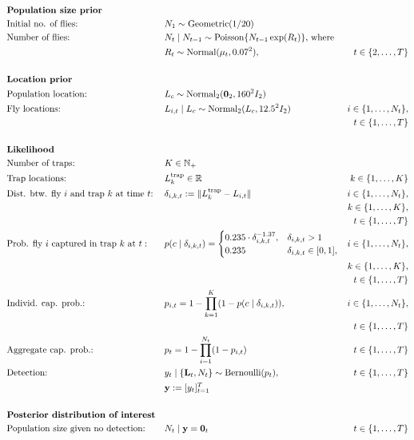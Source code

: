 \documentclass[
  oneside]{book}
\begin{document}
\[
\renewcommand{\baselinestretch}{1}\normalsize
\begin{aligned}
&\textbf{Population size prior} \\
&\text{Initial no. of flies:} && N_1  \sim \mathrm{Geometric}(1/20) \\
& \text{Number of flies:}~ && N_t \mid N_{t-1}  \sim \mathrm{Poisson}\{ N_{t-1} \exp(R_t) \} \text{, where} \\ & && R_t \sim \mathrm{Normal}(\mu_t, 0.07^2), & t \in \{2, \ldots, T \} \\
\\
&\textbf{Location prior} \\
& \text{Population location:} ~ && L_c \sim \mathrm{Normal_2}(\mathbf 0_2, 160^2 I_2) \\
& \text{Fly locations:}~ && L_{i,t} \mid L_c \sim \mathrm{Normal}_2(L_c, 12.5^2 I_2) & i \in \{1, \ldots, N_t\}, \\
  &&&& t \in \{1, \ldots, T\}\\
\\
&\textbf{Likelihood} \\
& \text{Number of traps:}~ && K \in \mathbb N_+ \\
& \text{Trap locations:}~ && L_k^\text{trap} \in \mathbb R & k \in \{1, \ldots, K\} \\
& \text{Dist. btw. fly } i \text{ and trap } k \text{ at time } t \text{:} && \delta_{i,k,t} := \lVert L_k^\text{trap} - L_{i,t} \rVert & i \in \{1, \ldots, N_t\}, \\
  &&&& k \in \{1, \ldots, K\}, \\
  &&&& t \in \{1, \ldots, T\}\\
& \text{Prob. fly } i \text{ captured in trap }k \text{ at } t: && p(c \mid \delta_{i,k,t}) = \begin{cases}0.235 \cdot \delta_{i,k,t}^{-1.37}, & \delta_{i,k,t} > 1 \\ 0.235 & \delta_{i,k,t} \in [0,1],\end{cases} & i \in \{1, \ldots, N_t\}, \\
  &&&& k \in \{1, \ldots, K\}, \\
  &&&& t \in \{1, \ldots, T\}\\
& \text{Individ. cap. prob.:} && p_{i, t} = 1 - \prod_{k=1}^K (1 - p(c \mid \delta_{i,k,t})), & i \in \{1, \ldots, N_t\}, \\
  &&&& t \in \{1, \ldots, T\} \\
& \text{Aggregate cap. prob.:} && p_t = 1 - \prod_{i=1}^{N_t} (1 - p_{i,t}) & t \in \{1, \ldots, T\} \\
&\text{Detection:}~ && y_t \mid \{ \mathbf L_t, N_t \} \sim \operatorname{Bernoulli}(p_t), & t \in \{1, \ldots, T\} \\
  &&& \mathbf y := [y_t]_{t=1}^T \\ \\
&\textbf{Posterior distribution of interest} \\
&\text{Population size given no detection:} && N_t \mid \mathbf y = \mathbf 0_t & t \in \{1, \ldots, T\}
\end{aligned}
\renewcommand{\baselinestretch}{1}\normalsize
\]
\end{document}
